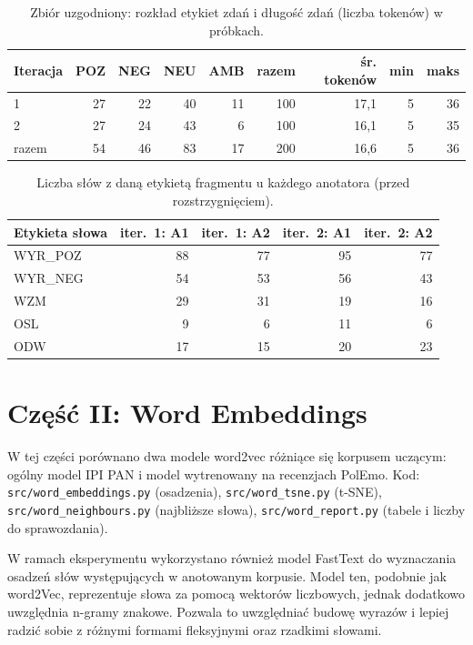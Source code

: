 \documentclass[11pt,a4paper]{article}
\begin{document}
\begin{table}[H]
\centering\small
\begin{tabular}{lrrrrrrrr}
\toprule
Iteracja & POZ & NEG & NEU & AMB & razem & śr. tokenów & min & maks \\
\midrule
1 & 27 & 22 & 40 & 11 & 100 & 17,1 & 5 & 36 \\
2 & 27 & 24 & 43 & 6 & 100 & 16,1 & 5 & 35 \\
\midrule
razem & 54 & 46 & 83 & 17 & 200 & 16,6 & 5 & 36 \\
\bottomrule
\end{tabular}
\caption{Zbiór uzgodniony: rozkład etykiet zdań i długość zdań (liczba tokenów) w próbkach.}
\label{tab:final}
\end{table}

\begin{table}[H]
\centering\small
\begin{tabular}{lrrrr}
\toprule
Etykieta słowa & iter.~1: A1 & iter.~1: A2 & iter.~2: A1 & iter.~2: A2 \\
\midrule
WYR\_POZ & 88 & 77 & 95 & 77 \\
WYR\_NEG & 54 & 53 & 56 & 43 \\
WZM & 29 & 31 & 19 & 16 \\
OSL & 9 & 6 & 11 & 6 \\
ODW & 17 & 15 & 20 & 23 \\
\bottomrule
\end{tabular}
\caption{Liczba słów z daną etykietą fragmentu u każdego anotatora (przed rozstrzygnięciem).}
\label{tab:tokcounts}
\end{table}

\section{Część II: Word Embeddings}\label{sec:we}

W tej części porównano dwa modele word2vec różniące się korpusem uczącym: ogólny model IPI PAN i model wytrenowany
na recenzjach PolEmo. Kod: \texttt{src/word\_embeddings.py} (osadzenia), \texttt{src/word\_tsne.py} (t-SNE),
\texttt{src/word\_neighbours.py} (najbliższe słowa), \texttt{src/word\_report.py} (tabele i liczby do sprawozdania).

W ramach eksperymentu wykorzystano również model FastText do wyznaczania osadzeń słów występujących w anotowanym korpusie. Model ten, podobnie jak word2Vec, reprezentuje słowa za pomocą wektorów liczbowych, jednak dodatkowo uwzględnia n-gramy znakowe. Pozwala to uwzględniać budowę wyrazów i lepiej radzić sobie z różnymi formami fleksyjnymi oraz rzadkimi słowami.
\end{document}
